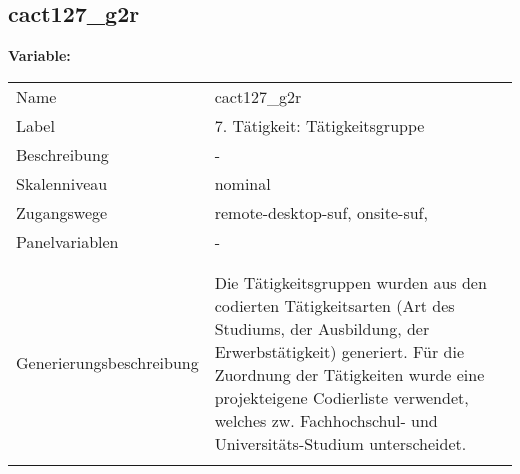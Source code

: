	
	
	\subsection{cact127\_g2r}
	\label{subSection:cact127_g2r}

	\noindent\textbf{Variable:}\\
		\begin{tabular}{lL{11.3cm}}
			\label{tableVariable:cact127_g2r}
			Name & cact127\_g2r \\
			Label & 7. Tätigkeit: Tätigkeitsgruppe  \\
			Beschreibung & - \\
			Skalenniveau & nominal \\
			Zugangswege &
				remote-desktop-suf,
				onsite-suf,
 \\
			Panelvariablen & -
			 \\
			 \\
 \\
					Generierungsbeschreibung & Die Tätigkeitsgruppen wurden aus den codierten Tätigkeitsarten (Art des Studiums, der Ausbildung, der Erwerbstätigkeit) generiert. Für die Zuordnung der Tätigkeiten wurde eine projekteigene Codierliste verwendet, welches zw. Fachhochschul- und Universitäts-Studium unterscheidet.
				 \\	
			 \\
		\end{tabular}






